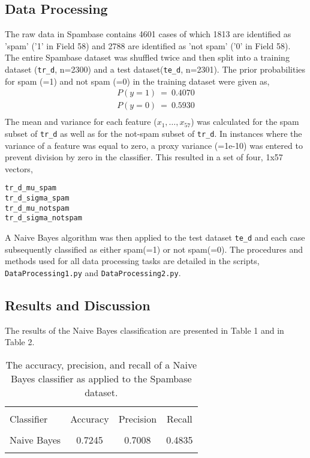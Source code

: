 \documentclass[12pt]{article}
\begin{document}
\newpage

\subsection{Data Processing}
The raw data in Spambase contains 4601 cases of which 1813 are identified as 'spam' ('1' in Field 58) and 2788 are identified as 'not spam' ('0' in Field 58). The entire Spambase dataset was shuffled twice and then split into a training dataset (\verb|tr_d|, n=2300) and a test dataset(\verb|te_d|, n=2301). The prior probabilities for spam (=1) and not spam (=0) in the training dataset were given as,
\begin{align*}
P(y = 1) \ = \ 0.4070\\
P(y = 0) \ = \ 0.5930\\
\end{align*}
The mean and variance for each feature ($x_1, \dots, x_{57}$) was calculated for the spam subset of \verb|tr_d| as well as for the not-spam subset of \verb|tr_d|. In instances where the variance of a feature was equal to zero, a proxy variance (=1e-10) was entered to prevent division by zero in the classifier. This resulted in a set of four, 1x57 vectors,
\begin{verbatim}
tr_d_mu_spam 
tr_d_sigma_spam
tr_d_mu_notspam 
tr_d_sigma_notspam	
\end{verbatim}

A Naive Bayes algorithm was then applied to the test dataset \verb|te_d| and each case subsequently classified as either spam(=1) or not spam(=0). The procedures and methods used for all data processing tasks are detailed in the scripts, \verb|DataProcessing1.py| and \verb|DataProcessing2.py|.

\newpage

\subsection{Results and Discussion}
The results of the Naive Bayes classification are presented in Table 1 and in Table 2. 

\begin{table}[!htbp] \centering 
  \caption{The accuracy, precision, and recall of a Naive Bayes classifier as applied to the Spambase dataset.} 
  \label{} 
\begin{tabular}{lccc} 
\\[-1.8ex]\hline 
\hline \\[-1.8ex] 
 Classifier & {Accuracy} & {Precision} & {Recall}\\
\hline \\[-1.8ex]
Naive Bayes & 0.7245 & 0.7008 & 0.4835\\
\hline \\[-1.8ex]
\end{tabular} 
\end{table}
\end{document}

